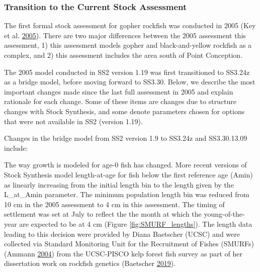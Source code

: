 \documentclass[12pt,]{article}
\begin{document}
\subsubsection{Transition to the Current Stock
Assessment}\label{transition-to-the-current-stock-assessment}

The first formal stock assessment for gopher rockfish was conducted in
2005 (Key et al. \protect\hyperlink{ref-Key2005}{2005}). There are two
major differences between the 2005 assessment this assessment, 1) this
assessment models gopher and black-and-yellow rockfish as a complex, and
2) this assessment includes the area south of Point Conception.

The 2005 model conducted in SS2 version 1.19 was first transitioned to
SS3.24z as a bridge model, before moving forward to SS3.30. Below, we
describe the most important changes made since the last full assessment
in 2005 and explain rationale for each change. Some of these items are
changes due to structure changes with Stock Synthesis, and some denote
parameters chosen for options that were not available in SS2 (version
1.19).

Changes in the bridge model from SS2 version 1.9 to SS3.24z and
SS3.30.13.09 include:

The way growth is modeled for age-0 fish has changed. More recent
versions of Stock Synthesis model length-at-age for fish below the first
reference age (Amin) as linearly increasing from the initial length bin
to the length given by the L\_at\_Amin parameter. The minimum population
length bin was reduced from 10 cm in the 2005 assessment to 4 cm in this
assessment. The timing of settlement was set at July to reflect the the
month at which the young-of-the-year are expected to be at 4 cm (Figure
\ref{fig:SMURF_lengths}). The length data leading to this decision were
provided by Diana Baetscher (UCSC) and were collected via Standard
Monitoring Unit for the Recruitment of Fishes (SMURFs) (Ammann
\protect\hyperlink{ref-Ammann2004}{2004}) from the UCSC-PISCO kelp
forest fish survey as part of her dissertation work on rockfish genetics
(Baetscher \protect\hyperlink{ref-Baetscher2019}{2019}).
\end{document}
